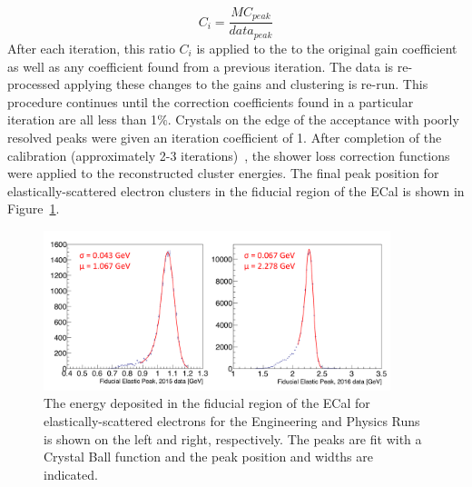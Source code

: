 \begin{equation}
	\label{eq:feeiter}
	C_i = \dfrac{MC_{peak}}{data_{peak}}
\end{equation}
After each iteration, this ratio $C_i$ is applied to the to the original gain coefficient as well as any coefficient found from a previous iteration. The data is re-processed applying these changes to the gains and clustering is re-run. This procedure continues until the correction coefficients found in a particular iteration are all less than 1$\%$. Crystals on the edge of the acceptance with poorly resolved peaks were given an iteration coefficient of 1. After completion of the calibration (approximately 2-3 iterations)~\cite{szumila-vance_hps_2016}, the shower loss correction functions were applied to the reconstructed cluster energies. The final peak position for elastically-scattered electron clusters in the fiducial region of the ECal is shown in Figure~\ref{Figure:FeeFidPeak}.\\

\begin{figure}[htb]
  \centering
      \includegraphics[width=0.9\textwidth]{pics/performance/feePeakFid.png}
  \caption[Reconstructed elastic peak in the ECal for the Engineering and Physics Runs]{The energy deposited in the fiducial region of the ECal for elastically-scattered electrons for the Engineering and Physics Runs is shown on the left and right, respectively. The peaks are fit with a Crystal Ball function and the peak position and widths are indicated. }
  \label{Figure:FeeFidPeak}
\end{figure}

